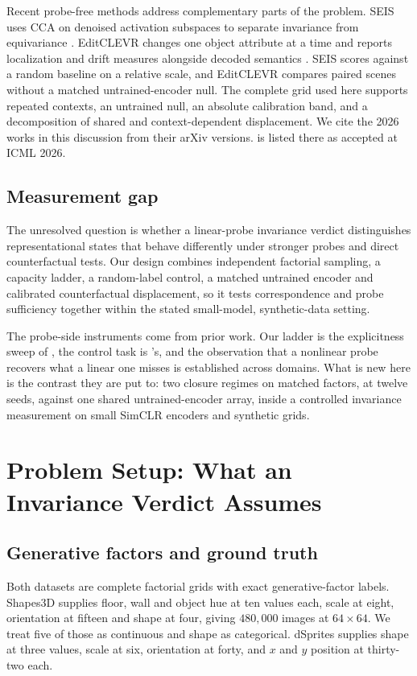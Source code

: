 \documentclass[10pt]{article}
\begin{document}
Recent probe-free methods address complementary parts of the problem. SEIS uses CCA on denoised
activation subspaces to separate invariance from equivariance \citep{lin2026seis}. EditCLEVR changes
one object attribute at a time and reports localization and drift measures alongside decoded
semantics \citep{karnam2026editclevr}. SEIS scores against a random baseline on a relative
scale, and EditCLEVR compares paired scenes without a matched untrained-encoder null. The complete
grid used here
supports repeated contexts, an untrained null, an absolute calibration band, and a decomposition of
shared and context-dependent displacement. We cite the 2026 works in this discussion
\citep{lee2026shallow,lin2026seis,karnam2026editclevr,chaudhry2026geometry} from their arXiv
versions. \citet{chaudhry2026geometry} is listed there as accepted at ICML 2026.

\subsection{Measurement gap}
\label{sec:positioning}
The unresolved question is whether a linear-probe invariance verdict distinguishes representational
states that behave differently under stronger probes and direct counterfactual tests. Our design combines independent factorial sampling, a capacity ladder, a random-label control, a
matched untrained encoder and calibrated counterfactual displacement, so it tests correspondence
and probe sufficiency together within the stated small-model, synthetic-data setting.

The probe-side instruments come from prior work. Our ladder is the explicitness sweep of
\citet{eastwood2023dcies}, the control task is \citet{hewitt2019designing}'s, and the observation
that a nonlinear probe recovers what a linear one misses is established across domains. What is new
here is the contrast they are put to: two closure regimes on matched factors, at twelve seeds,
against one shared untrained-encoder array, inside a controlled invariance measurement on small
SimCLR encoders and synthetic grids.

\section{Problem Setup: What an Invariance Verdict Assumes}
\label{sec:defs}

\subsection{Generative factors and ground truth}
Both datasets are complete factorial grids with exact generative-factor labels. Shapes3D supplies
floor, wall and object hue at ten values each, scale at
eight, orientation at fifteen and shape at four, giving $480{,}000$ images at $64\times64$. We treat
five of those as continuous and shape as categorical. dSprites supplies shape at three values,
scale at six, orientation at forty, and $x$ and $y$ position at thirty-two each.
\end{document}
